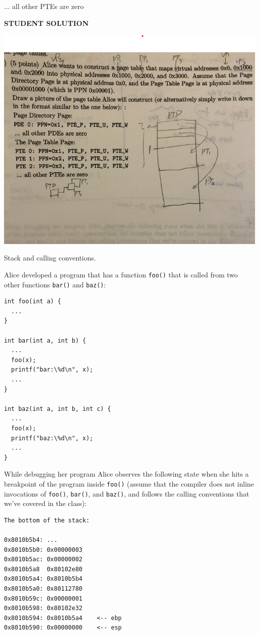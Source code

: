 \documentclass[11pt]{exam}
\begin{document}
\begin{questions}
\begin{parts}
... all other PTEs are zero

\end{parts} 

\textbf{STUDENT SOLUTION } 
\begin{adjustwidth}{1.5em}{1em}
\includegraphics[width=0.5\columnwidth]{figs/point-2a-ans}
\end{adjustwidth}
\vfill

\newpage \addpoints

\question Stack and calling conventions. 

Alice developed a program that has a function \texttt{foo()} that is called
from two other functions \texttt{bar()} and \texttt{baz()}:

\begin{verbatim}
int foo(int a) {
  ...
}

int bar(int a, int b) {
  ...
  foo(x);
  printf("bar:\%d\n", x); 
  ...
}

int baz(int a, int b, int c) {
  ...
  foo(x);
  printf("baz:\%d\n", x);
  ...
}
\end{verbatim}

While debugging her program Alice observes the following state when she hits a breakpoint of the 
program inside \texttt{foo()} (assume that the compiler does not inline invocations of \texttt{foo()}, 
\texttt{bar()}, and \texttt{baz()}, and follows the calling conventions that we've covered in the class):

\begin{verbatim}
The bottom of the stack:

0x8010b5b4: ... 
0x8010b5b0: 0x00000003
0x8010b5ac: 0x00000002 
0x8010b5a8  0x80102e80 
0x8010b5a4: 0x8010b5b4 
0x8010b5a0: 0x80112780 
0x8010b59c: 0x00000001 
0x8010b598: 0x80102e32 
0x8010b594: 0x8010b5a4    <-- ebp
0x8010b590: 0x00000000    <-- esp
\end{verbatim}

\begin{parts} 


\end{parts}
\end{questions}
\end{document}
